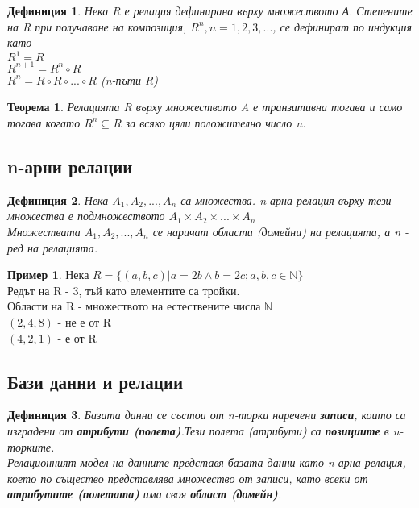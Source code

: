 \documentclass[fleqn, 12pt]{article}
\newtheorem{definition}{Дефиниция}[subsection]
\newtheorem{theorem}{Теорема}[subsection]
\theoremstyle{definition}
\newtheorem{example}{Пример}[subsection]
\begin{document}
\begin{definition}
Нека R е релация дефинирана върху множеството А. Степените на R при получаване на композиция, $R^n, n = 1, 2, 3, ...$, се дефинират по индукция като \\
$R^1 = R$ \\
$R^{n+1} = R^n \circ R$ \\
$R^n = R \circ R \circ ... \circ R$ (n-пъти R)
\end{definition}

\begin{theorem}
Релацията R върху множеството A е транзитивна тогава и само тогава когато $R^n \subseteq R$ за всяко цяли положително число n.
\end{theorem}

\subsection{n-арни релации}

\begin{definition}
Нека $A_1, A_2, ..., A_n$ са множества. n-арна релация върху тези множества е подмножеството $A_1 \times A_2 \times ... \times A_n$ \\
Множествата $A_1, A_2, ..., A_n$ се наричат области (домейни) на релацията, а n - ред на релацията. 
\end{definition}

\begin{example}
Нека  $R = \{ (a, b, c) | a = 2b \land b = 2c; a,b,c \in \mathbb{N} \}$\\
Редът на R - 3, тъй като елементите са тройки. \\
Области на R - множеството на естествените числа $\mathbb{N}$ \\
$(2, 4, 8)$ - не е от R \\
$(4, 2, 1)$ - е от R
\end{example}

\subsection{Бази данни и релации}

\begin{definition}
Базата данни се състои от n-торки  наречени \textbf{записи}, които са изградени от \textbf{атрибути (полета)}.Тези полета (атрибути) са \textbf{позициите} в n-торките.\\
Релационният модел на данните представя базата данни като n-арна релация, което по същество представлява множество от записи, като всеки от \textbf{атрибутите (полетата)} има своя \textbf{област (домейн)}.
\end{definition}
\end{document}
